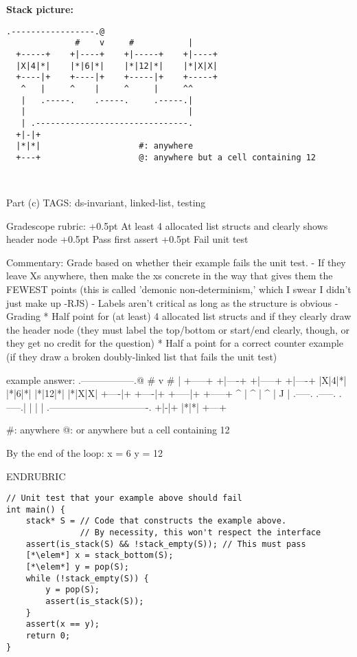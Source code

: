 \begin{parts}
\begin{framed}
\textbf{Stack picture:}
\ifprintanswers
\begin{lstlisting}[basicstyle=\basicstyle\color{\answerColor}, aboveskip=-0.7cm, belowskip=0pt]
                   .-----------------.@
              #    v     #           |
  +-----+    +|----+    +|-----+    +|----+
  |X|4|*|    |*|6|*|    |*|12|*|    |*|X|X|
  +----|+    +----|+    +-----|+    +-----+
   ^   |     ^    |     ^     |     ^^
   |   .-----.    .-----.     .-----.|
   |                                 |
   | .-------------------------------.
  +|-|+
  |*|*|                    #: anywhere
  +---+                    @: anywhere but a cell containing 12
\end{lstlisting}
\else~\vspace{2.1in}\fi
\end{framed}

\RUBRIC
Part (c)
TAGS: ds-invariant, linked-list, testing

Gradescope rubric:
+0.5pt At least 4 allocated list structs and clearly shows header node
+0.5pt Pass first assert
+0.5pt Fail unit test

Commentary:
Grade based on whether their example fails the unit test.
 - If they leave Xs anywhere, then make the xs concrete in the way
   that gives them the FEWEST points (this is called 'demonic
   non-determinism,' which I swear I didn't just make up -RJS)
 - Labels aren't critical as long as the structure is obvious
 - Grading
    * Half point for (at least) 4 allocated list structs
      and if they clearly draw the header node (they must label the
      top/bottom or start/end clearly, though, or they get no credit
      for the question)
    * Half a point for a correct counter example (if they draw a
    broken doubly-linked list that fails the unit test)

example answer:
                 .-----------------.@
            #    v     #           |
+-----+    +|----+    +|-----+    +|----+
|X|4|*|    |*|6|*|    |*|12|*|    |*|X|X|
+----|+    +----|+    +-----|+    +-----+
 ^   |     ^    |     ^     |     ^^
 |   .-----.    .-----.     .-----.|
 |                                 |
 | .-------------------------------.
+|-|+
|*|*|
+---+

#: anywhere
@: or anywhere but a cell containing 12

By the end of the loop:
x = 6
y = 12

ENDRUBRIC

\enlargethispage{5ex}
\begin{lstlisting}[belowskip=0pt]
// Unit test that your example above should fail
int main() {
    stack* S = // Code that constructs the example above.
               // By necessity, this won't respect the interface
    assert(is_stack(S) && !stack_empty(S)); // This must pass
    [*\elem*] x = stack_bottom(S);
    [*\elem*] y = pop(S);
    while (!stack_empty(S)) {
        y = pop(S);
        assert(is_stack(S));
    }
    assert(x == y);
    return 0;
}
\end{lstlisting}

\end{parts}

\egroup
